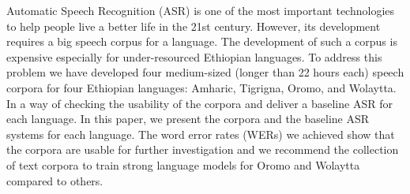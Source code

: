 Automatic Speech Recognition (ASR) is one of the most important technologies to help people live a better life in the 21st century. However, its development requires a big speech corpus for a language. The development of such a corpus is expensive especially for under-resourced Ethiopian languages. To address this problem we have developed four medium-sized (longer than 22 hours each) speech corpora for four Ethiopian languages: Amharic, Tigrigna, Oromo, and Wolaytta. In a way of checking the usability of the corpora and deliver a baseline ASR for each language. In this paper, we present the corpora and the baseline ASR systems for each language. The word error rates (WERs) we achieved show that the corpora are usable for further investigation and we recommend the collection of text corpora to train strong language models for Oromo and Wolaytta compared to others.
